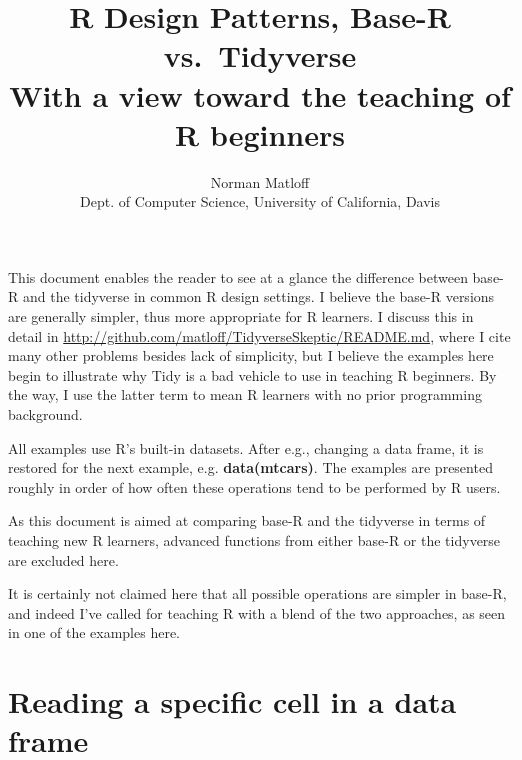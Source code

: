 \documentclass[11pt]{article}
\title{R Design Patterns, Base-R vs.\ Tidyverse \\
   With a view toward the teaching of R beginners}
\author{Norman Matloff \\
      Dept. of Computer Science, University of California, Davis}
\begin{document}
\maketitle

This document enables the reader to see at a glance the difference
between base-R and the tidyverse in common R design settings.  I believe
the base-R versions are generally simpler, thus more appropriate for R
learners.  I discuss this in detail in
\url{http://github.com/matloff/TidyverseSkeptic/README.md}, where I
cite many other problems besides lack of simplicity, but I believe the
examples here begin to illustrate why Tidy is a bad vehicle to use in
teaching R beginners.  By the way, I use the latter term to mean R
learners with no prior programming background.

All examples use R's built-in datasets.  After e.g., changing a data
frame, it is restored for the next example, e.g. \textbf{data(mtcars)}.
The examples are presented roughly in order of how often these
operations tend to be performed by R users.

As this document is aimed at comparing base-R and the tidyverse in terms
of teaching new R learners, advanced functions from either base-R or the
tidyverse are excluded here.

It is certainly not claimed here that all possible operations are
simpler in base-R, and indeed I've called for teaching R with a blend of
the two approaches, as seen in one of the examples here.  

\section*{Reading a specific cell in a data frame}



\begin{parcolumns}[rulebetween=true]{2}


\hspace{0.1in}


\end{parcolumns}
\end{document}
